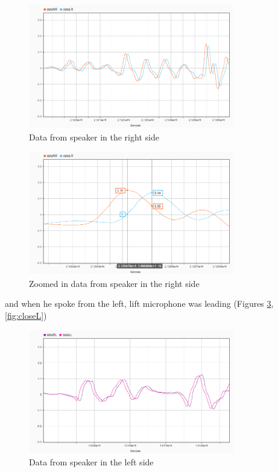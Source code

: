 \begin{figure}[htp]
	\centering
	\includegraphics[width=0.8\textwidth]{Illustrations/DataR.png}
	\caption{Data from speaker in the right side}
	\label{fig:R}
\end{figure}

\begin{figure}[htp]
	\centering
	\includegraphics[width=0.8\textwidth]{Illustrations/DataR_with_Markers.png}
	\caption{Zoomed in data from speaker in the right side}
	\label{fig:closeR}
\end{figure}

 and when he spoke from the left, lift microphone was leading (Figures  \ref{fig:L}, \ref{fig:closeL})
 
 \begin{figure}[htp]
	\centering
	\includegraphics[width=0.8\textwidth]{Illustrations/DataL.png}
	\caption{Data from speaker in the left side}
	\label{fig:L}
\end{figure}

